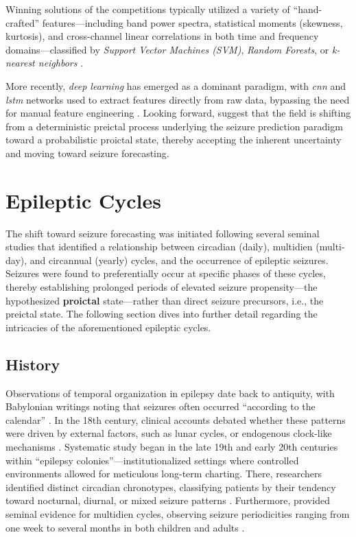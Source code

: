 Winning solutions of the competitions typically utilized a variety of \enquote{hand-crafted} features---including band power spectra, statistical moments (skewness, kurtosis), and cross-channel linear correlations in both time and frequency domains---classified by \textit{Support Vector Machines (SVM)}, \textit{Random Forests}, or \textit{k-nearest neighbors} \parencite{kuhlmann_epilepsyecosystemorg_2018, muller_coherent_2022}.

More recently, \textit{deep learning} has emerged as a dominant paradigm, with \textit{\gls{cnn}} and \textit{\gls{lstm}} networks used to extract features directly from raw data, bypassing the need for manual feature engineering \parencite{kuhlmann_epilepsyecosystemorg_2018, muller_coherent_2022}.
Looking forward, \textcite{freestone_forward-looking_2017} suggest that the field is shifting from a deterministic preictal process underlying the seizure prediction paradigm toward a probabilistic proictal state, thereby accepting the inherent uncertainty and moving toward seizure forecasting. 



\section{Epileptic Cycles}
The shift toward seizure forecasting was initiated following several seminal studies \parencite{baud_multi-day_2018, proix_forecasting_2021} that identified a relationship between circadian (daily), multidien (multi-day), and circannual (yearly) cycles, and the occurrence of epileptic seizures. 
Seizures were found to preferentially occur at specific phases of these cycles, thereby establishing prolonged periods of elevated seizure propensity---the hypothesized \textbf{proictal} state---rather than direct seizure precursors, i.e., the preictal state. 
The following section dives into further detail regarding the intricacies of the aforementioned epileptic cycles.


\subsection{History}
Observations of temporal organization in epilepsy date back to antiquity, with Babylonian writings noting that seizures often occurred \enquote{according to the calendar} \parencite{wilson_translation_1990}. 
In the 18th century, clinical accounts debated whether these patterns were driven by external factors, such as lunar cycles, or endogenous clock-like mechanisms \parencite{mead_treatise_1748, karoly_cycles_2021}. 
Systematic study began in the late 19th and early 20th centuries within \enquote{epilepsy colonies}---institutionalized settings where controlled environments allowed for meticulous long-term charting. 
There, researchers identified distinct circadian chronotypes, classifying patients by their tendency toward nocturnal, diurnal, or mixed seizure patterns \parencite{gowers_epilepsy_1881, langdon-down_time_1929}. 
Furthermore, \textcite{griffiths_rhythm_1938} provided seminal evidence for multidien cycles, observing seizure periodicities ranging from one week to several months in both children and adults \parencite{karoly_cycles_2021, baud_multi-day_2018}.


